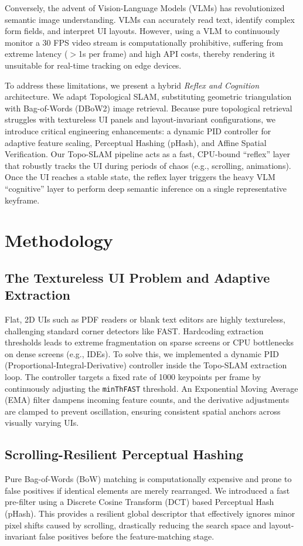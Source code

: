 \documentclass[journal]{IEEEtran}
\begin{document}
Conversely, the advent of Vision-Language Models (VLMs) has revolutionized semantic image understanding. VLMs can accurately read text, identify complex form fields, and interpret UI layouts. However, using a VLM to continuously monitor a 30 FPS video stream is computationally prohibitive, suffering from extreme latency ($>$1s per frame) and high API costs, thereby rendering it unsuitable for real-time tracking on edge devices.

To address these limitations, we present a hybrid \textit{Reflex and Cognition} architecture. We adapt Topological SLAM, substituting geometric triangulation with Bag-of-Words (DBoW2) image retrieval. Because pure topological retrieval struggles with textureless UI panels and layout-invariant configurations, we introduce critical engineering enhancements: a dynamic PID controller for adaptive feature scaling, Perceptual Hashing (pHash), and Affine Spatial Verification. Our Topo-SLAM pipeline acts as a fast, CPU-bound ``reflex'' layer that robustly tracks the UI during periods of chaos (e.g., scrolling, animations). Once the UI reaches a stable state, the reflex layer triggers the heavy VLM ``cognitive'' layer to perform deep semantic inference on a single representative keyframe.

\section{Methodology}

\subsection{The Textureless UI Problem and Adaptive Extraction}
Flat, 2D UIs such as PDF readers or blank text editors are highly textureless, challenging standard corner detectors like FAST. Hardcoding extraction thresholds leads to extreme fragmentation on sparse screens or CPU bottlenecks on dense screens (e.g., IDEs). To solve this, we implemented a dynamic PID (Proportional-Integral-Derivative) controller inside the Topo-SLAM extraction loop. The controller targets a fixed rate of 1000 keypoints per frame by continuously adjusting the \texttt{minThFAST} threshold. An Exponential Moving Average (EMA) filter dampens incoming feature counts, and the derivative adjustments are clamped to prevent oscillation, ensuring consistent spatial anchors across visually varying UIs.

\subsection{Scrolling-Resilient Perceptual Hashing}
Pure Bag-of-Words (BoW) matching is computationally expensive and prone to false positives if identical elements are merely rearranged. We introduced a fast pre-filter using a Discrete Cosine Transform (DCT) based Perceptual Hash (pHash). This provides a resilient global descriptor that effectively ignores minor pixel shifts caused by scrolling, drastically reducing the search space and layout-invariant false positives before the feature-matching stage.
\end{document}
